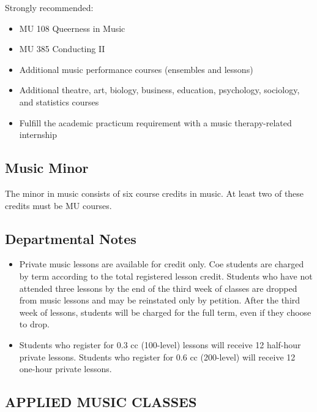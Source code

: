\documentclass[
  letterpaper,
]{scrbook}
\providecommand{\tightlist}{%
  \setlength{\itemsep}{0pt}\setlength{\parskip}{0pt}}
\begin{document}
Strongly recommended:

\begin{itemize}
\tightlist
\item
  MU 108 Queerness in Music\\
\item
  MU 385 Conducting II\\
\item
  Additional music performance courses (ensembles and lessons)\\
\item
  Additional theatre, art, biology, business, education, psychology,
  sociology, and statistics courses\\
\item
  Fulfill the academic practicum requirement with a music
  therapy-related internship
\end{itemize}

\subsection{Music Minor}\label{music-minor}

The minor in music consists of six course credits in music. At least two
of these credits must be MU courses.

\subsection{Departmental Notes}\label{departmental-notes}

\begin{itemize}
\tightlist
\item
  Private music lessons are available for credit only. Coe students are
  charged by term according to the total registered lesson credit.
  Students who have not attended three lessons by the end of the third
  week of classes are dropped from music lessons and may be reinstated
  only by petition. After the third week of lessons, students will be
  charged for the full term, even if they choose to drop.\\
\item
  Students who register for 0.3 cc (100-level) lessons will receive 12
  half-hour private lessons. Students who register for 0.6 cc
  (200-level) will receive 12 one-hour private lessons.
\end{itemize}

\subsection{APPLIED MUSIC CLASSES}\label{sec-MUA-classes}
\end{document}
